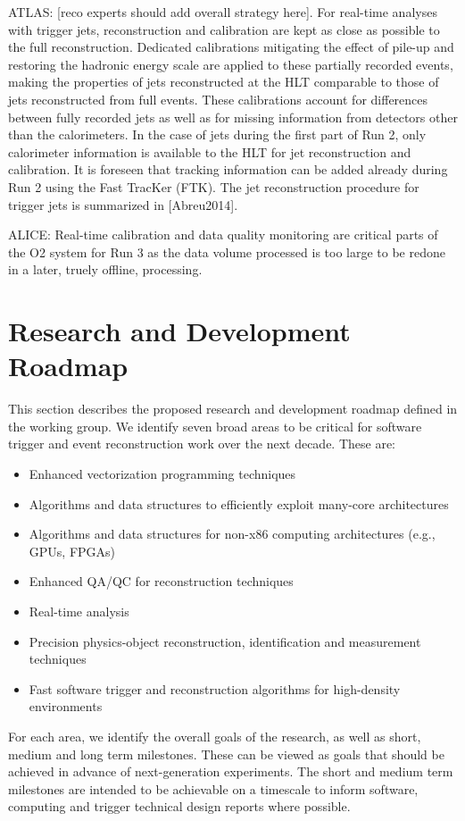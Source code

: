 ATLAS: [reco experts should add overall strategy here]. For real-time analyses with trigger jets, reconstruction and calibration are  kept as close as possible to the full reconstruction. Dedicated calibrations mitigating the effect of pile-up and restoring the hadronic energy scale are applied to these partially recorded events, making the properties of jets reconstructed at the HLT comparable to those of jets reconstructed from full events. These calibrations account for differences between fully recorded jets as well as for missing information from detectors other than the calorimeters. In the case of jets during the first part of Run 2, only calorimeter information is available to the HLT for jet reconstruction and calibration. It is foreseen that tracking information can be added already during Run 2 using the Fast TracKer (FTK). The jet reconstruction procedure for trigger jets is summarized in [Abreu2014]. 

ALICE: Real-time calibration and data quality monitoring are critical parts of the O2 system for Run 3 as the data volume processed is too large to be redone in a later, truely offline, processing.

\section{Research and Development Roadmap}

This section describes the proposed research and development roadmap defined in the working group. We identify seven broad areas to be critical for software trigger and event reconstruction work over the next decade. These  are:
\begin{itemize}
\item Enhanced vectorization programming techniques
\item Algorithms and data structures to efficiently exploit many-core architectures
\item Algorithms and data structures for non-x86 computing architectures (e.g., GPUs, FPGAs)
\item Enhanced QA/QC for reconstruction techniques
\item Real-time analysis
\item Precision physics-object reconstruction, identification and measurement techniques
\item Fast software trigger and reconstruction algorithms for high-density environments
\end{itemize}
For each area, we identify the overall goals of the research, as well as short, medium and long term milestones. These can be viewed as goals that should be achieved in advance of next-generation experiments. The short and medium term milestones are intended to be achievable on a timescale to inform software, computing and trigger technical design reports where possible.


